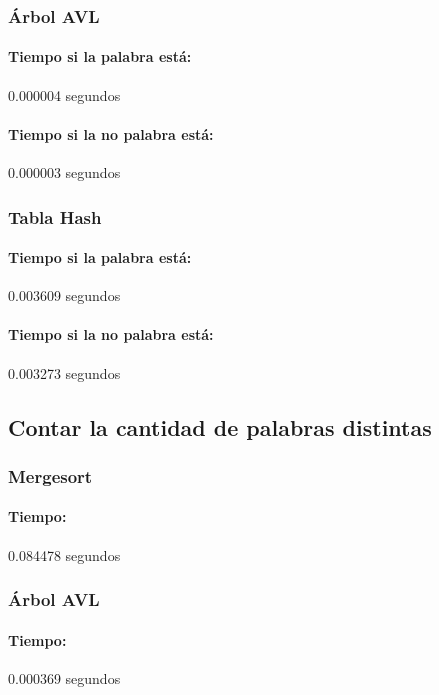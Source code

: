 \documentclass[12pt,letterpaper]{scrartcl}
\begin{document}
\subsubsection{Árbol AVL}

\paragraph{Tiempo si la palabra está:} 0.000004 segundos

\paragraph{Tiempo si la no palabra está:} 0.000003 segundos

\subsubsection{Tabla Hash}

\paragraph{Tiempo si la palabra está:} 0.003609 segundos

\paragraph{Tiempo si la no palabra está:}  0.003273 segundos


\subsection{Contar la cantidad de palabras distintas}

\subsubsection{Mergesort}

\paragraph{Tiempo:} 0.084478 segundos


\subsubsection{Árbol AVL}

\paragraph{Tiempo:} 0.000369 segundos
\end{document}
